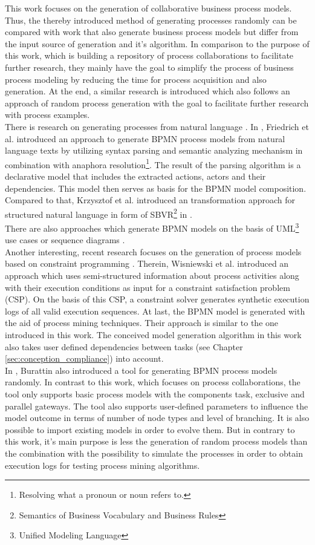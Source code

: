 This work focuses on the generation of collaborative business process models. Thus, the thereby introduced method of generating processes randomly can be compared with work that also generate business process models but differ from the input source of generation and it's algorithm. In comparison to the purpose of this work, which is building a repository of process collaborations to facilitate further research, they mainly have the goal to simplify the process of business process modeling by reducing the time for process acquisition and also generation. At the end, a similar research is introduced which also follows an approach of random process generation with the goal to facilitate further research with process examples.\\
There is research on generating processes from natural language \cite{natlang1}\cite{natlang2}. In \cite{natlang1}, Friedrich et al. introduced an approach to generate BPMN process models from natural language texts by utilizing syntax parsing and semantic analyzing mechanism in combination with anaphora resolution\footnote{Resolving what a pronoun or noun refers to.}. The result of the parsing algorithm is a declarative model that includes the extracted actions, actors and their dependencies. This model then serves as basis for the BPMN model composition. Compared to that, Krzysztof et al. introduced an transformation approach for structured natural language in form of SBVR\footnote{Semantics of Business Vocabulary and Business Rules} in \cite{natlang2}.\\
There are also approaches which generate BPMN models on the basis of UML\footnote{Unified Modeling Language} use cases \cite{relUML1} \cite{relUML2} or sequence diagrams \cite{relUML3}.\\
Another interesting, recent research focuses on the generation of process models based on constraint programming \cite{relCP}. Therein, Wisniewski et al. introduced an approach which uses semi-structured information about process activities along with their execution conditions as input for a constraint satisfaction problem (CSP). On the basis of this CSP, a constraint solver generates synthetic execution logs of all valid execution sequences. At last, the BPMN model is generated with the aid of process mining techniques. Their approach is similar to the one introduced in this work. The conceived model generation algorithm in this work also takes user defined dependencies between tasks (see Chapter \ref{sec:conception_compliance}) into account.\\
In \cite{relPLG}, Burattin also introduced a tool for generating BPMN process models randomly. In contrast to this work, which focuses on process collaborations, the tool only supports basic process models with the components task, exclusive and parallel gateways. The tool also supports user-defined parameters to influence the model outcome in terms of number of node types and level of branching. It is also possible to import existing models in order to evolve them. But in contrary to this work, it's main purpose is less the generation of random process models than the combination with the possibility to simulate the processes in order to obtain execution logs for testing process mining algorithms.